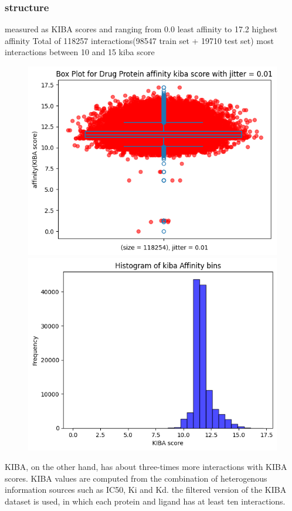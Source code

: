 \documentclass[11pt, a4paper]{article}
\begin{document}
        \subsubsection{structure}
            measured as KIBA scores and ranging from 0.0 least affinity to 17.2 highest affinity
            Total of 118257 interactions(98547 train set + 19710 test set)
            most interactions between 10 and 15 kiba score
            \begin{figure}[H]
                \centering
                \begin{minipage}{0.45\textwidth}
                \includegraphics[width=\textwidth]{kiba/boxplot.png}
                \end{minipage}
                \hfill
                \begin{minipage}{0.45\textwidth}
                \includegraphics[width=\textwidth]{kiba/histogram.png}
                \end{minipage}
            \end{figure}
            KIBA, on the other hand, has about three-times more interactions with KIBA scores. KIBA values are computed from the
            combination of heterogenous information sources such as IC50, Ki and Kd. the filtered version of the KIBA
            dataset is used, in which each protein and ligand has at least ten interactions. 
\end{document}
